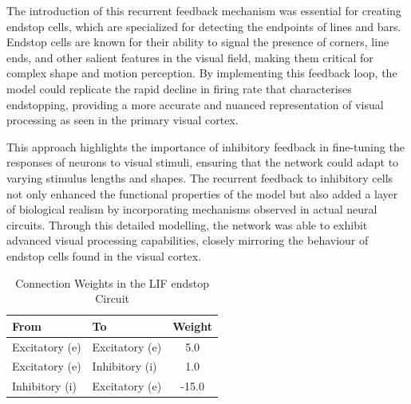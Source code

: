 \documentclass[12pt]{article}
\begin{document}
The introduction of this recurrent feedback mechanism was essential for creating endstop cells, which are specialized for detecting the endpoints of lines and bars. Endstop cells are known for their ability to signal the presence of corners, line ends, and other salient features in the visual field, making them critical for complex shape and motion perception. By implementing this feedback loop, the model could replicate the rapid decline in firing rate that characterises endstopping, providing a more accurate and nuanced representation of visual processing as seen in the primary visual cortex.

This approach highlights the importance of inhibitory feedback in fine-tuning the responses of neurons to visual stimuli, ensuring that the network could adapt to varying stimulus lengths and shapes. The recurrent feedback to inhibitory cells not only enhanced the functional properties of the model but also added a layer of biological realism by incorporating mechanisms observed in actual neural circuits. Through this detailed modelling, the network was able to exhibit advanced visual processing capabilities, closely mirroring the behaviour of endstop cells found in the visual cortex.

\begin{table}[h]
  \centering
  \caption{Connection Weights in the LIF endstop Circuit}
  \begin{tabular}{@{}llc@{}}
      \toprule
      \textbf{From} & \textbf{To} & \textbf{Weight} \\ \midrule
      Excitatory (e) & Excitatory (e) & 5.0 \\
      Excitatory (e) & Inhibitory (i) & 1.0 \\
      Inhibitory (i) & Excitatory (e) & -15.0 \\ \bottomrule
  \end{tabular}
\end{table}
\end{document}
